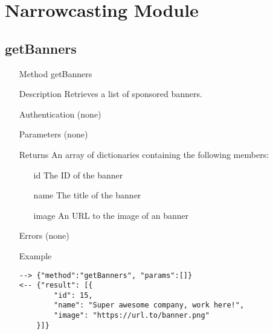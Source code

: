 \documentclass[a4paper]{scrreprt}
\begin{document}
\clearpage
\section{Narrowcasting Module}
\subsection{getBanners}
\begin{enumerate}
\item[Method] getBanners
\item[Description] Retrieves a list of sponsored banners.
\item[Authentication] (none)
\item[Parameters] (none)
\item[Returns] An array of dictionaries containing the following members:
\begin{enumerate}
    \item[id] The ID of the banner
    \item[name] The title of the banner
	\item[image] An URL to the image of an banner
    \end{enumerate}
\item[Errors] (none)
\item[Example]
\begin{lstlisting}
--> {"method":"getBanners", "params":[]}
<-- {"result": [{
        "id": 15,
        "name": "Super awesome company, work here!",
        "image": "https://url.to/banner.png"
    }]}
\end{lstlisting}
\end{enumerate}
\clearpage
\end{document}
